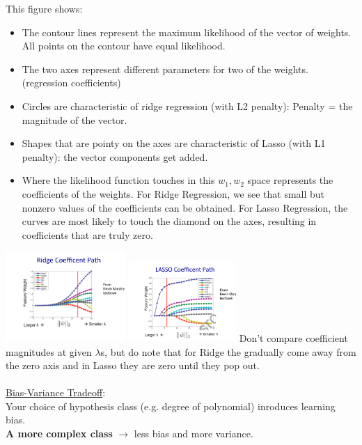 This figure shows: 
\begin{itemize}
	\item The contour lines represent the maximum likelihood of the vector of weights.  
		All points on the contour have equal likelihood.
	\item The two axes represent different parameters for two of the weights.  (regression coefficients)
	\item Circles are characteristic of ridge regression (with L2 penalty): Penalty = the magnitude of the vector.
	\item Shapes that are pointy on the axes are characteristic of Lasso (with L1 penalty): the vector components get added. 
	\item Where the likelihood function touches in this $w_1, w_2$ space represents the coefficients of the weights.
		For Ridge Regression, we see that small but nonzero values of the coefficients can be obtained.
		For Lasso Regression, the curves are most likely to touch the diamond on the axes, 
		resulting in coefficients that are truly zero. 
\end{itemize} 

\includegraphics[width=1.8in]{figures/lambda_with_w2.pdf}  \includegraphics[width=1.6in]{figures/lambda_with_w1.pdf}
Don't compare coefficient magnitudes at given $\lambda$s, 
but do note that for Ridge the gradually come away from the zero axis and in Lasso they are zero until they pop out.   \hfill \\ \hfill \\

\underline{Bias-Variance Tradeoff}:   \hfill \\
Your choice of hypothesis class (e.g. degree of polynomial) inroduces learning bias.  \hfill \\
\textbf{A more complex class } $\rightarrow$ less bias and more variance.  \hfill \\  \hfill \\

